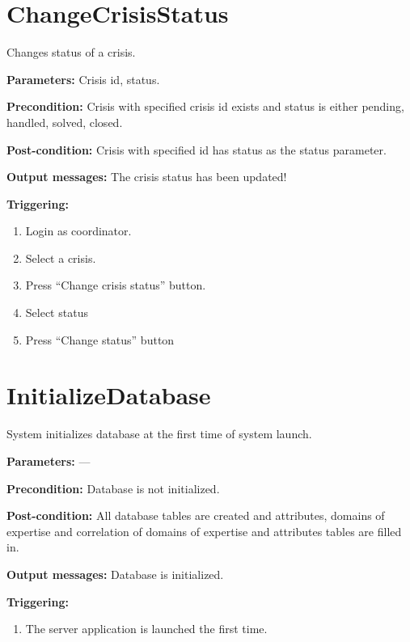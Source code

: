 \section{ChangeCrisisStatus}
\label{operation:ChangeCrisisStatus}
Changes status of a crisis.

\begin{description}

\item \textbf{Parameters:} Crisis id, status.
\item \textbf{Precondition:} Crisis with specified crisis id exists and status
is either pending, handled, solved, closed.
\item \textbf{Post-condition:} Crisis with specified id has status as
the status parameter.

\item \textbf{Output messages:} The crisis status has been updated!

\item \textbf{Triggering:}
\begin{enumerate}
\item Login as coordinator.
\item Select a crisis.
\item Press ``Change crisis status'' button.
\item Select status
\item Press ``Change status'' button
\end{enumerate}
 
\end{description}

\section{InitializeDatabase}
\label{operation:InitializeDatabase}
System initializes database at the first time of system launch.

\begin{description}

\item \textbf{Parameters:} ---
\item \textbf{Precondition:} Database is not initialized.
\item \textbf{Post-condition:} All database tables are created and attributes,
domains of expertise and correlation of domains of expertise and attributes
tables are filled in.

\item \textbf{Output messages:} Database is initialized.

\item \textbf{Triggering:}
\begin{enumerate}
\item The server application is launched the first time.
\end{enumerate}
 
\end{description}